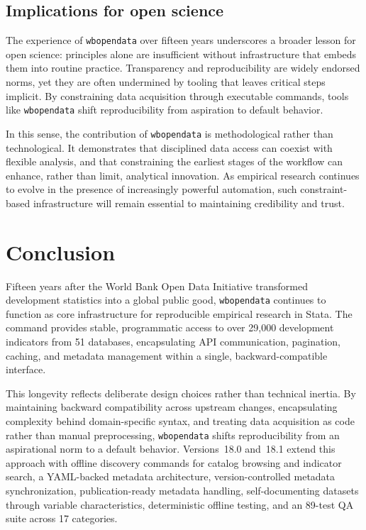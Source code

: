 \documentclass[bib]{statapress}
\begin{document}
\subsection{Implications for open science}

The experience of \texttt{wbopendata} over fifteen years underscores a broader
lesson for open science: principles alone are insufficient without
infrastructure that embeds them into routine practice. Transparency and
reproducibility are widely endorsed norms, yet they are often undermined by
tooling that leaves critical steps implicit. By constraining data acquisition
through executable commands, tools like \texttt{wbopendata} shift reproducibility
from aspiration to default behavior.

In this sense, the contribution of \texttt{wbopendata} is methodological rather
than technological. It demonstrates that disciplined data access can coexist
with flexible analysis, and that constraining the earliest stages of the
workflow can enhance, rather than limit, analytical innovation. As empirical
research continues to evolve in the presence of increasingly powerful
automation, such constraint-based infrastructure will remain essential to
maintaining credibility and trust.

\section{Conclusion}\label{sec:conclusion}

Fifteen years after the World Bank Open Data Initiative transformed development
statistics into a global public good, \texttt{wbopendata} continues to function
as core infrastructure for reproducible empirical research in Stata. The command
provides stable, programmatic access to over 29{,}000 development indicators from
51 databases, encapsulating API communication, pagination, caching, and metadata
management within a single, backward-compatible interface.

This longevity reflects deliberate design choices rather than technical inertia.
By maintaining backward compatibility across upstream changes, encapsulating
complexity behind domain-specific syntax, and treating data acquisition as code
rather than manual preprocessing, \texttt{wbopendata} shifts reproducibility from
an aspirational norm to a default behavior. Versions~18.0 and~18.1 extend this approach
with offline discovery commands for catalog browsing and indicator search,
a YAML-backed metadata architecture, version-controlled metadata synchronization,
publication-ready metadata handling, self-documenting datasets through variable
characteristics, deterministic offline testing, and an 89-test QA suite across
17 categories.
\end{document}
